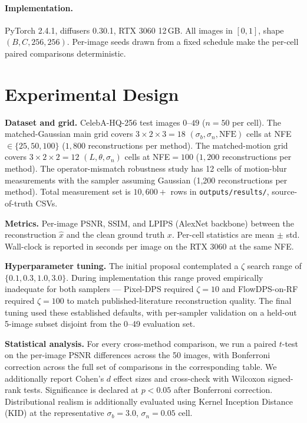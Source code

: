 \documentclass{article}
\begin{document}
\paragraph{Implementation.} PyTorch 2.4.1, diffusers 0.30.1, RTX 3060
12\,GB. All images in $[0,1]$, shape $(B, C, 256, 256)$. Per-image
seeds drawn from a fixed schedule make the per-cell paired comparisons
deterministic.

\section{Experimental Design}

\textbf{Dataset and grid.} CelebA-HQ-256 test images $0$--$49$ ($n{=}50$
per cell). The matched-Gaussian main grid covers $3 \times 2 \times 3 = 18$
$(\sigma_b, \sigma_n, \text{NFE})$ cells at NFE${\in}\{25,50,100\}$
($1{,}800$ reconstructions per method). The matched-motion grid covers
$3\times 2\times 2 = 12$ $(L, \theta, \sigma_n)$ cells at NFE${=}100$
($1{,}200$ reconstructions per method). The operator-mismatch
robustness study has 12 cells of motion-blur measurements with the
sampler assuming Gaussian (1,200 reconstructions per method). Total
measurement set is $10{,}600+$ rows in
\texttt{outputs/results/}, source-of-truth CSVs.

\textbf{Metrics.} Per-image PSNR, SSIM, and LPIPS (AlexNet backbone)
between the reconstruction $\hat x$ and the clean ground truth $x$.
Per-cell statistics are mean $\pm$ std. Wall-clock is reported in
seconds per image on the RTX 3060 at the same NFE.

\textbf{Hyperparameter tuning.} The initial proposal contemplated a
$\zeta$ search range of $\{0.1, 0.3, 1.0, 3.0\}$. During implementation
this range proved empirically inadequate for both samplers — Pixel-DPS
required $\zeta{=}10$ and FlowDPS-on-RF required $\zeta{=}100$ to match
published-literature reconstruction quality. The final tuning used
these established defaults, with per-sampler validation on a held-out
5-image subset disjoint from the 0--49 evaluation set.

\textbf{Statistical analysis.} For every cross-method comparison, we
run a paired $t$-test on the per-image PSNR differences across the 50
images, with Bonferroni correction across the full set of comparisons
in the corresponding table. We additionally report Cohen's $d$ effect
sizes and cross-check with Wilcoxon signed-rank tests. Significance is
declared at $p<0.05$ after Bonferroni correction. Distributional
realism is additionally evaluated using Kernel Inception Distance
(KID) at the representative $\sigma_b{=}3.0$, $\sigma_n{=}0.05$ cell.
\end{document}

